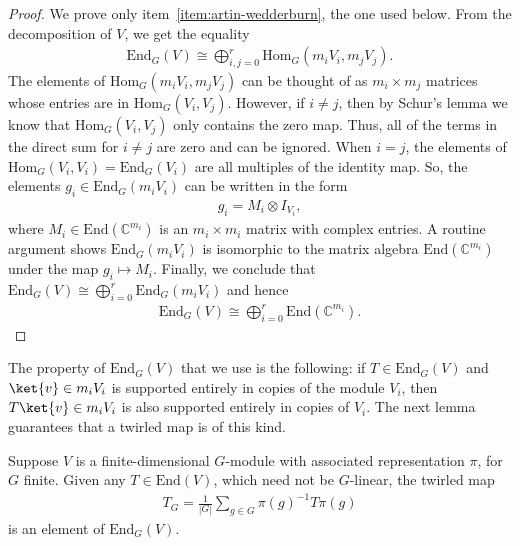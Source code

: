 \begin{proof}
    We prove only item~\ref{item:artin-wedderburn}, the one used below.
    From the decomposition of $V$, we get the equality
    \begin{align}
        \mathrm{End}_G(V) \cong \bigoplus_{i,j = 0}^r \mathrm{Hom}_G(m_iV_i,m_jV_j).
    \end{align}
    The elements of $\mathrm{Hom}_G(m_i V_i, m_j V_j)$ can be thought of as $m_i \times m_j$ matrices whose entries are in $\mathrm{Hom}_G(V_i, V_j)$. 
    However, if $i \neq j$, then by Schur's lemma we know that $\mathrm{Hom}_G(V_i, V_j)$ only contains the zero map. 
    Thus, all of the terms in the direct sum for $i \neq j$ are zero and can be ignored. 
    When $i = j$, the elements of $\mathrm{Hom}_G(V_i,V_i) = \mathrm{End}_G(V_i)$ are all multiples of the identity map. 
    So, the elements $g_i \in \mathrm{End}_G(m_iV_i)$ can be written in the form
    \begin{align}
        g_i = M_i \otimes I_{V_i},
    \end{align}
    where $M_i \in \mathrm{End}(\mathbb{C}^{m_i})$ is an $m_i \times m_i$ matrix with complex entries. 
    A routine argument shows $\mathrm{End}_G(m_iV_i)$ is isomorphic to the matrix algebra $\mathrm{End}(\mathbb{C}^{m_i})$ under the map $g_i \mapsto M_i$.
    Finally, we conclude that $\mathrm{End}_G(V) \cong \bigoplus_{i = 0}^r \mathrm{End}_G(m_i V_i)$ and hence
    \begin{align}
        \mathrm{End}_G(V) \cong \bigoplus_{i=0}^r \mathrm{End}(\mathbb{C}^{m_i}).
    \end{align}
\end{proof}

The property of $\mathrm{End}_G(V)$ that we use is the following: if $T \in \mathrm{End}_G(V)$ and $\ket{v} \in m_i V_i$ is supported entirely in copies of the module $V_i$, then $T\ket{v} \in m_i V_i$ is also supported entirely in copies of $V_i$.
The next lemma guarantees that a twirled map is of this kind.

\begin{lemma}[Twirling] \label{lem:twirling}
    Suppose $V$ is a finite-dimensional $G$-module with associated representation $\pi$, for $G$ finite. Given any $T \in \mathrm{End}(V)$, which need not be $G$-linear, the twirled map
    \begin{align}
        T_G = \frac{1}{|G|} \sum_{g \in G} \pi(g)^{-1} T \pi(g)
    \end{align}
    is an element of $\mathrm{End}_G(V)$.
\end{lemma}

